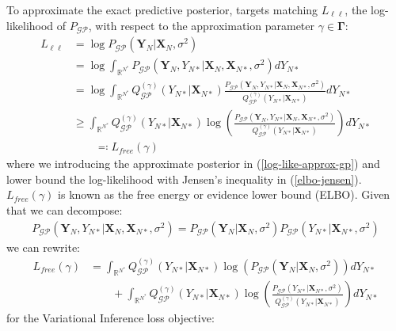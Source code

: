 \documentclass{article}
\newcommand{\GP}{\operatorname{\mathcal{GP}}}
\numberwithin{equation}{section}
\begin{document}
To approximate the exact predictive posterior, \cite{titsias2009variational} targets matching $L_{\ell \ell}$, the log-likelihood of $P_{\GP}$, with respect to the approximation parameter $\gamma \in \boldsymbol{\Gamma}$:
\begin{align}
    L_{\ell \ell} &= \log P_{\GP}\left(\mathbf{Y}_N \vert \mathbf{X}_N, \sigma^2\right) \\ 
     \label{log-like}
    &= \log \int_{\mathbb{R}^{N^*}} P_{\GP}\left(\mathbf{Y}_N, Y_{N*} \vert \mathbf{X}_{N}, \mathbf{X}_{N*}, \sigma^2\right) d Y_{N*} \\
     \label{log-like-approx-gp}
&= \log \int_{\mathbb{R}^{N^*}} Q^{(\gamma)}_{\GP}\left(Y_{N*} \vert \mathbf{X}_{N*}\right) \frac{P_{\GP}\left(\mathbf{Y}_N, Y_{N*} \vert \mathbf{X}_{N}, \mathbf{X}_{N*}, \sigma^2\right)}{Q^{(\gamma)}_{\GP}\left(Y_{N*} \vert \mathbf{X}_{N*}\right)} d Y_{N*}\\
&\geq \int_{\mathbb{R}^{N^*}} Q^{(\gamma)}_{\GP}\left(Y_{N*} \vert \mathbf{X}_{N*}\right) \log\left(\frac{P_{\GP}\left(\mathbf{Y}_N, Y_{N*} \vert \mathbf{X}_{N}, \mathbf{X}_{N*}, \sigma^2\right)}{Q^{(\gamma)}_{\GP}\left(Y_{N*} \vert \mathbf{X}_{N*}\right)} \right)d Y_{N*}
 \label{elbo-jensen}
 \\ & \qquad \eqqcolon L_{free}(\gamma)
 \label{elbo-definition}
\end{align}
where we introducing the approximate posterior in (\ref{log-like-approx-gp}) and lower bound the log-likelihood with Jensen's inequality in (\ref{elbo-jensen}). $L_{free}(\gamma)$ is known as the free energy or evidence lower bound (ELBO). Given that we can decompose:
\begin{align}
    P_{\GP}\left(\mathbf{Y}_N, Y_{N*} \vert \mathbf{X}_{N}, \mathbf{X}_{N*}, \sigma^2\right) = P_{\GP} \left(\mathbf{Y}_N \vert \mathbf{X}_{N}, \sigma^2\right) P_{\GP}\left(Y_{N*}\vert \mathbf{X}_{N*}, \sigma^2 \right)
\end{align}
we can rewrite:
\begin{align}
    L_{free}(\gamma) &= \int_{\mathbb{R}^{N^*}} Q^{(\gamma)}_{\GP}(Y_{N*} \vert \mathbf{X}_{N*}) \log \left(P_{\GP}\left(\mathbf{Y}_N \vert \mathbf{X}_{N}, \sigma^2\right)\right) d Y_{N*} \nonumber
    \\ & \qquad + \int_{\mathbb{R}^{N^*}} Q^{(\gamma)}_{\GP}(Y_{N*} \vert \mathbf{X}_{N*}) \log \left(\frac{P_{\GP}\left( Y_{N*} \vert \mathbf{X}_{N*}, \sigma^2\right) }{Q^{(\gamma)}_{\GP}\left(Y_{N*} \vert \mathbf{X}_{N*}\right)}\right) d Y_{N*}
\end{align}
for the Variational Inference loss objective:
\end{document}
